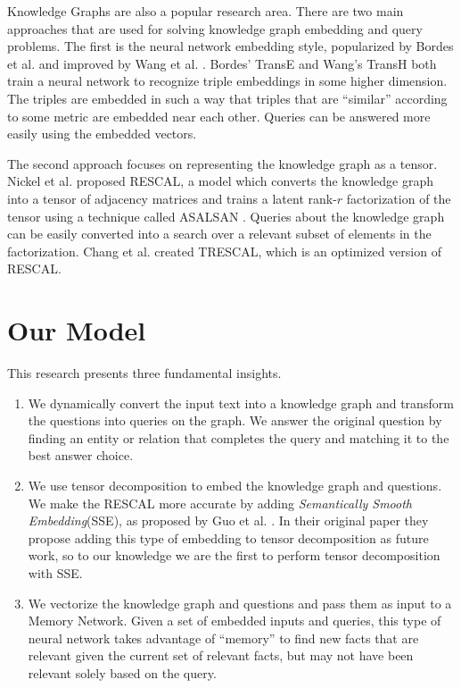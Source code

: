 \documentclass[pageno]{final_paper}
\begin{document}
Knowledge Graphs are also a popular research area. There are two main approaches
that are used for solving knowledge graph embedding and query problems. The
first is the neural network embedding style, popularized by Bordes et al.
\cite{Bordes2013} and improved by Wang et al. \cite{Wang2014}. Bordes' TransE
and Wang's TransH both train a neural network to recognize triple embeddings in
some higher dimension. The triples are embedded in such a way that triples that
are ``similar'' according to some metric are embedded near each other. Queries
can be answered more easily using the embedded vectors.

The second approach focuses on representing the knowledge graph as a tensor.
Nickel et al. \cite{Nickel2011} proposed RESCAL, a model which converts the
knowledge graph into a tensor of adjacency matrices and trains a latent rank-$r$
factorization of the tensor using a technique called ASALSAN \cite{Bader2007}.
Queries about the knowledge graph can be easily converted into a search over a
relevant subset of elements in the factorization. Chang et al. \cite{Chang2014}
created TRESCAL, which is an optimized version of RESCAL.

\section{Our Model}
\label{Our Model}

This research presents three fundamental insights.

\begin{enumerate}

    \item We dynamically convert the input text into a knowledge graph and
    transform the questions into queries on the graph. We answer the original
    question by finding an entity or relation that completes the query and
    matching it to the best answer choice.

    \item We use tensor decomposition to embed the knowledge graph and
    questions. We make the RESCAL \cite{Nickel2011} more accurate by adding
    \textit{Semantically Smooth Embedding}(SSE), as proposed by Guo et al.
    \cite{Guo2015}. In their original paper they propose adding this type of
    embedding to tensor decomposition as future work, so to our knowledge we are
    the first to perform tensor decomposition with SSE.

    \item We vectorize the knowledge graph and questions and pass them as input
    to a Memory Network. Given a set of embedded inputs and queries, this type
    of neural network takes advantage of ``memory'' to find new facts that are
    relevant given the current set of relevant facts, but may not have been
    relevant solely based on the query.

\end{enumerate}
\end{document}
